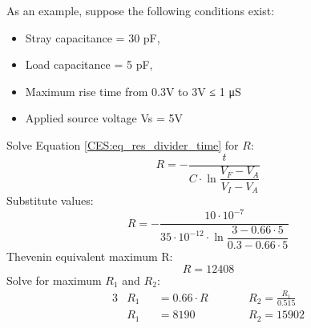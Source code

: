         \begin{example} As an example, suppose the following conditions exist:
          \begin{itemize}\addtolength{\itemsep}{-0.5\baselineskip}
            \item Stray capacitance = 30 pF,
            \item Load capacitance = 5 pF,
            \item Maximum rise time from 0.3V to 3V ≤ 1 μS
            \item Applied source voltage Vs = 5V
          \end{itemize}
          Solve Equation \ref{CES:eq_res_divider_time} for $R$:  
          \begin{equation*}
            R = - \dfrac{t}{C\cdot\ln\dfrac{V_F-V_A}{V_I-V_A}}
          \end{equation*}   
          Substitute values:
          \begin{equation*}
            R = - \dfrac{10\cdot10^{-7}}{35\cdot10^{-12}\cdot
                  \ln\dfrac{3-0.66\cdot5}{0.3-0.66\cdot5}}
          \end{equation*}               
          Thevenin equivalent maximum R: $$R = 12408$$
          Solve for maximum $R_1$ and $R_2$:
          \begin{alignat}{3}
            & R_1 &&= 0.66\cdot R  \qquad &&R_2 = \frac{R_1}{0.515}  \\
            & R_1 &&= 8190         \qquad &&R_2 = 15902 
          \end{alignat}          
        \end{example} 
                   
